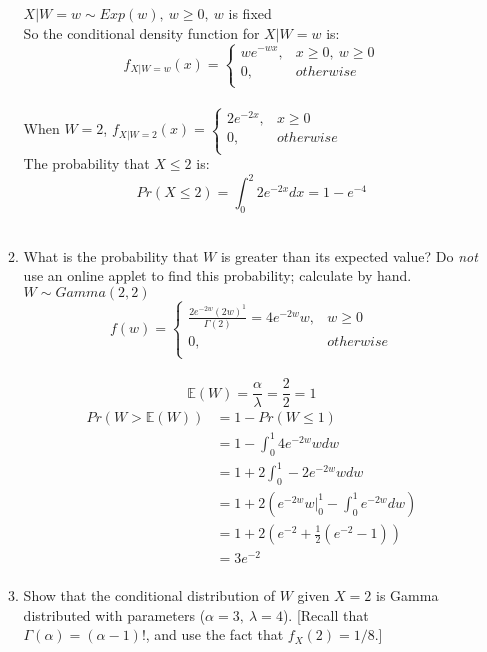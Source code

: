 \documentclass[11pt]{article}
\begin{document}
\begin{enumerate}[label=\textbf{Question \arabic*:},start=1]
\begin{enumerate}
$X|W=w \sim Exp(w),\ w \geq 0,\ w$ is fixed \\
So the conditional density function for $X|W=w$ is:
$$f_{X | W = w}(x) = \begin{cases}
		w e^{-wx}, & x \geq 0,\ w \geq 0 \\ 
		0, & otherwise\\
		\end{cases}$$\\


When $W = 2$, $f_{X | W = 2}(x) = \begin{cases}
		2 e^{-2x}, & x \geq 0 \\ 
		0, & otherwise\\
		\end{cases}$\\
		
The probability that $X \leq 2$ is: $$Pr(X \leq 2) = \int_{0}^{2} 2 e^{-2x} dx = 1 - e^{-4}$$\\


\item What is the probability that $W$ is greater than its expected value? Do {\em not} use an online applet to find this probability; calculate by hand.\\

$W \sim Gamma(2, 2)$ \\
$$f(w) = \begin{cases}
		\frac{2 e^{-2w} (2w)^1}{\Gamma(2)} = 4 e^{-2w} w, & w \geq 0 \\ 
		0, & otherwise\\
		\end{cases}$$\\

$$\mathbb{E}(W) = \frac{\alpha}{\lambda} = \frac{2}{2} = 1$$
\begin{align*}
Pr(W > \mathbb{E}(W)) & = 1 - Pr(W \leq 1) \\
& = 1 - \int_{0}^{1} 4 e^{-2w} w dw \\
& = 1 + 2 \int_{0}^{1} -2 e^{-2w} w dw \\
& = 1 + 2 ( e^{-2w} w |_{0}^{1} - \int_{0}^{1} e^{-2w}dw ) \\
& = 1 + 2 ( e^{-2} + \frac{1}{2} (e^{-2} - 1))  \\
& = 3 e^{-2} \\ 
\end{align*}

\item Show that the conditional distribution of $W$ given $X=2$ is Gamma distributed with parameters ($\alpha=3,\ \lambda=4$). [Recall that $\Gamma(\alpha) = (\alpha-1)!$, and use the fact that $f_X(2) = 1/8$.]\\


\end{enumerate}
\end{enumerate}
\end{document}
